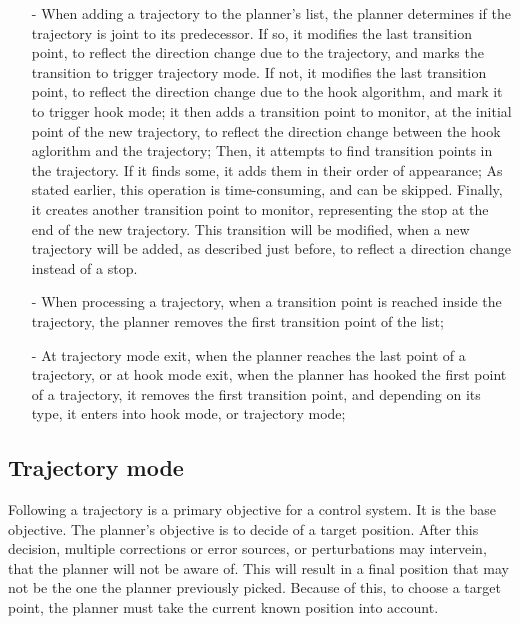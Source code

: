 \begin{itemize}

\item[-] When adding a trajectory to the planner's list, the planner determines if the trajectory is joint to 
its predecessor.
If so, it modifies the last transition point, to reflect the direction change due to the trajectory, 
and marks the transition to trigger trajectory mode.
If not, it modifies the last transition point, to reflect the direction change due to the hook algorithm, 
and mark it to trigger hook mode;
it then adds a transition point to monitor, at the initial point of the new trajectory, to reflect the 
direction change between the hook aglorithm and the trajectory;
Then, it attempts to find transition points in the trajectory.
If it finds some, it adds them in their order of appearance;
As stated earlier, this operation is time-consuming, and can be skipped.
Finally, it creates another transition point to monitor, representing the stop at the end of the new 
trajectory. This transition will be modified, when a new trajectory will be added, as described just before, 
to reflect a direction change instead of a stop.

\item[-] When processing a trajectory, when a transition point is reached inside the trajectory, the planner 
removes the first transition point of the list;

\item[-] At trajectory mode exit, when the planner reaches the last point of a trajectory, or at hook mode 
exit, when the planner has hooked the first point of a trajectory, it removes the first transition point, 
and depending on its type, it enters into hook mode, or trajectory mode;

\end{itemize}

\newpage

\subsection{Trajectory mode}

Following a trajectory is a primary objective for a control system. It is the base objective.
The planner's objective is to decide of a target position. After this decision, multiple corrections
or error sources, or perturbations may intervein, that the planner will not be aware of. 
This will result in a final position that may not be the one the planner previously picked. 
Because of this, to choose a target point, the planner must take the current known position into account.
\newline 

